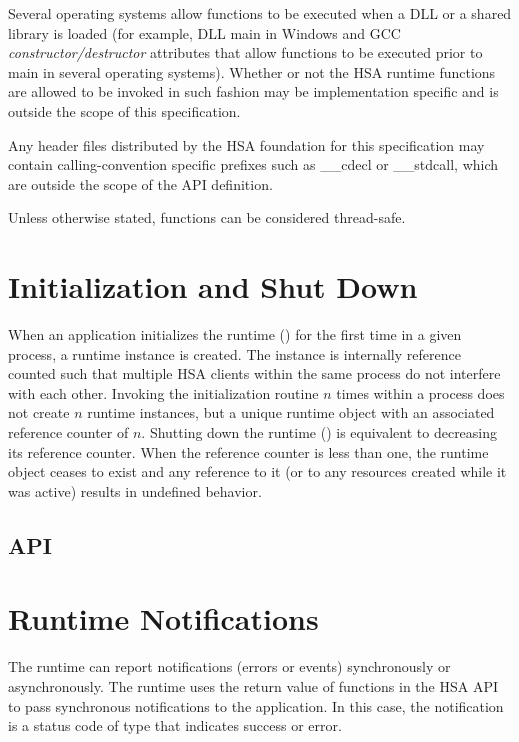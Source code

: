 \documentclass[final,oneside]{book}
\begin{document}
Several operating systems allow functions to be executed when a DLL or a shared
library is loaded (for example, DLL main in Windows and GCC
\emph{constructor/destructor} attributes that allow functions to be executed
prior to main in several operating systems). Whether or not the HSA runtime
functions are allowed to be invoked in such fashion may be implementation
specific and is outside the scope of this specification.

Any header files distributed by the HSA foundation for this specification may
contain calling-convention specific prefixes such as __cdecl or __stdcall, which
are outside the scope of the API definition.

Unless otherwise stated, functions can be considered thread-safe.

\section{Initialization and Shut Down}\label{sec:init}
When an application initializes the runtime () for the first time
in a given process, a runtime instance is created. The instance is internally
reference counted such that multiple HSA clients within the same process do not
interfere with each other. Invoking the initialization routine $n$ times within
a process does not create $n$ runtime instances, but a unique runtime object
with an associated reference counter of $n$. Shutting down the runtime
() is equivalent to decreasing its reference counter. When
the reference counter is less than one, the runtime object ceases to exist and
any reference to it (or to any resources created while it was active) results in
undefined behavior.

\subsection{API}


\section{Runtime Notifications}
\label{sec:error}

The runtime can report notifications (errors or events) synchronously or
asynchronously. The runtime uses the return value of functions in the HSA API to
pass synchronous notifications to the application. In this case, the
notification is a status code of type  that indicates
success or error.
\end{document}

